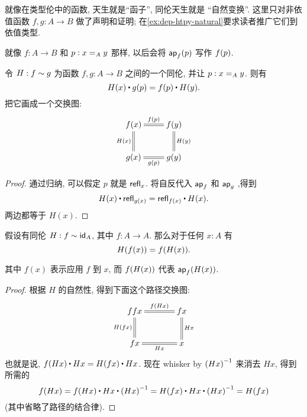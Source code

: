 %
%
就像在类型伦中的函数, 天生就是``函子'', 同伦天生就是
%
``自然变换''.
这里只对非依值函数 $f,g:A\to B$ 做了声明和证明;
在\cref{ex:dep-htpy-natural}要求读者推广它们到依值类型.

就像 $f:A\to B$ 和 $p:\id[A]xy$ 那样, 以后会将 $\apfunc{f} (p)$ 写作 $\ap f p$.

\begin{lem}
    \label{lem:htpy-natural}
    令 $H:f\htpy g$ 为函数  $f,g:A\to B$ 之间的一个同伦, 并让 $p:\id[A]xy$.
    则有
    \begin{equation*}
        H(x)\ct\ap{g}{p}=\ap{f}{p}\ct H(y).
    \end{equation*}
    把它画成一个交换图:
    \begin{align*}
        \xymatrix{
            f(x) \ar@{=}[r]^{\ap fp} \ar@{=}[d]_{H(x)} & f(y) \ar@{=}[d]^{H(y)} \\
            g(x) \ar@{=}[r]_{\ap gp} & g(y)
        }
    \end{align*}
\end{lem}
\begin{proof}
    通过归纳, 可以假定 $p$ 就是 $\refl x$.
    将自反代入 $\apfunc{f}$ 和 $\apfunc g$ ,得到
    \[ H(x) \ct \refl{g(x)} = \refl{f(x)} \ct H(x). \]
    两边都等于 $H(x)$.
\end{proof}

\begin{cor}
    \label{cor:hom-fg}
    假设有同伦 $H : f \htpy \idfunc[A]$, 其中 $f : A \to A$.
    那么对于任何 $x : A$ 有 \[ H(f(x)) = \ap f{H(x)}. \]
\end{cor}
\noindent
其中 $f(x)$ 表示应用 $f$ 到 $x$, 而 $\ap f{H(x)}$ 代表 $\apfunc{f}(H(x))$.
\begin{proof}
    根据 $H$ 的自然性, 得到下面这个路径交换图:
    \begin{align*}
        \xymatrix@C=3pc{
            ffx \ar@{=}[r]^-{\ap f{Hx}} \ar@{=}[d]_{H(fx)} & fx \ar@{=}[d]^{Hx} \\
            fx \ar@{=}[r]_-{Hx} & x
        }
    \end{align*}
    也就是说, $\ap f{H x} \ct H x = H(f x) \ct H x$.
    现在 whisker by $\opp{(H x)}$ 来消去 $H x$, 得到所需的
    \[ \ap f{H x}
    = \ap f{H x} \ct H x \ct \opp{(H x)}
    = H(f x) \ct H x \ct \opp{(H x)}
    = H(f x)
    \]
    (其中省略了路径的结合律).
\end{proof}

